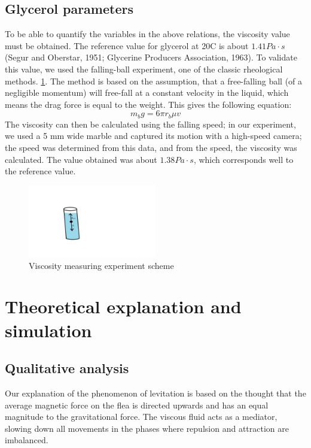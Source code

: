 \documentclass[10pt,a4paper]{article}
\begin{document}
\subsection{Glycerol parameters}
To be able to quantify the variables in the above relations, the viscosity value must be obtained. The reference value for  glycerol at 20\degree C is about $1.41 Pa \cdot s$ (Segur and Oberstar, 1951; Glycerine Producers Association, 1963). To validate this value, we used the falling-ball experiment, one of the classic rheological methods. \ref{obr:viskometr}. The method is based on the assumption, that a free-falling ball (of a negligible momentum) will free-fall at a constant velocity in the liquid, which means the drag force is equal to the weight. This gives the following equation:
\begin{equation}
 m_b g = 6 \pi r_b \mu v
 \label{stokes}
 \end{equation}
The viscosity can then be calculated using the falling speed; in our experiment, we used a 5 mm wide marble and captured its motion with a high-speed camera; the speed was determined from this data, and from the speed, the viscosity was calculated. The value obtained was about $1.38 Pa \cdot s$, which corresponds well to the reference value.

\begin{figure}[H]
  \centering
  \includegraphics[width=0.5\textwidth]{viskozita_nakres.png}
  \caption{Viscosity measuring experiment scheme}
  \label{obr:viskometr}
\end{figure}

\section{Theoretical explanation and simulation}

\subsection{Qualitative analysis}
Our explanation of the phenomenon of levitation is based on the thought that the average magnetic force on the flea is directed upwards and has an equal magnitude to the gravitational force. The viscous fluid acts as a mediator, slowing down all movements in the phases where repulsion and attraction are imbalanced.
\end{document}
